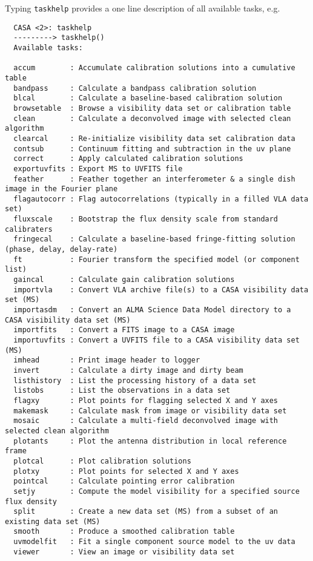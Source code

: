 Typing {\tt taskhelp} provides a one line description of all available 
tasks, e.g.
\small
\begin{verbatim}
  CASA <2>: taskhelp
  ---------> taskhelp()
  Available tasks: 

  accum        : Accumulate calibration solutions into a cumulative table
  bandpass     : Calculate a bandpass calibration solution
  blcal        : Calculate a baseline-based calibration solution
  browsetable  : Browse a visibility data set or calibration table
  clean        : Calculate a deconvolved image with selected clean algorithm
  clearcal     : Re-initialize visibility data set calibration data
  contsub      : Continuum fitting and subtraction in the uv plane
  correct      : Apply calculated calibration solutions
  exportuvfits : Export MS to UVFITS file
  feather      : Feather together an interferometer & a single dish image in the Fourier plane
  flagautocorr : Flag autocorrelations (typically in a filled VLA data set)
  fluxscale    : Bootstrap the flux density scale from standard calibraters
  fringecal    : Calculate a baseline-based fringe-fitting solution (phase, delay, delay-rate)
  ft           : Fourier transform the specified model (or component list)
  gaincal      : Calculate gain calibration solutions
  importvla    : Convert VLA archive file(s) to a CASA visibility data set (MS)
  importasdm   : Convert an ALMA Science Data Model directory to a CASA visibility data set (MS)
  importfits   : Convert a FITS image to a CASA image
  importuvfits : Convert a UVFITS file to a CASA visibility data set (MS)
  imhead       : Print image header to logger
  invert       : Calculate a dirty image and dirty beam
  listhistory  : List the processing history of a data set
  listobs      : List the observations in a data set
  flagxy       : Plot points for flagging selected X and Y axes
  makemask     : Calculate mask from image or visibility data set
  mosaic       : Calculate a multi-field deconvolved image with selected clean algorithm
  plotants     : Plot the antenna distribution in local reference frame
  plotcal      : Plot calibration solutions
  plotxy       : Plot points for selected X and Y axes
  pointcal     : Calculate pointing error calibration
  setjy        : Compute the model visibility for a specified source flux density
  split        : Create a new data set (MS) from a subset of an existing data set (MS)
  smooth       : Produce a smoothed calibration table
  uvmodelfit   : Fit a single component source model to the uv data
  viewer       : View an image or visibility data set
\end{verbatim}
\normalsize

